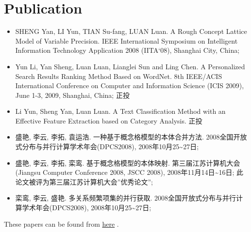 \documentclass[a4paper,10pt,english]{manual}
\begin{document}
\section{Publication}
\begin{itemize}
\item {} 
SHENG Yan, LI Yun, TIAN Su-fang, LUAN Luan. A Rough Concept Lattice Model of Variable Precision. IEEE International Symposium on Intelligent Information Technology Application 2008 (IITA`08), Shanghai City, China;

\item {} 
Yun Li, Yan Sheng, Luan Luan, Lianglei Sun and Ling Chen. A Personalized Search Results Ranking Method Based on WordNet. 8th IEEE/ACIS International Conference on Computer and Information Science (ICIS 2009), June 1-3, 2009, Shanghai, China; 正投

\item {} 
Li Yun, Sheng Yan, Luan Luan. A Text Classification Method with an Effective Feature Extraction based on Category Analysis. 正投

\item {} 
盛艳, 李云, 李拓, 袁运浩. 一种基于概念格模型的本体合并方法. 2008全国开放式分布与并行计算学术年会(DPCS2008), 2008年10月25\textasciitilde{}27日;

\item {} 
盛艳, 李云, 李拓, 栾鸾. 基于概念格模型的本体映射. 第三届江苏计算机大会(Jiangsu Computer Conference 2008, JSCC 2008), 2008年11月14日\textasciitilde{}16日; 此论文被评为第三届江苏计算机大会''优秀论文'';

\item {} 
栾鸾, 李云, 盛艳. 多关系频繁项集的并行获取. 2008全国开放式分布与并行计算学术年会(DPCS2008), 2008年10月25\textasciitilde{}27日;

\end{itemize}

These papers can be found from \href{http://github.com/lizzie/lizworkspace/tree/cb82ad8d84a1b1a12df80e3508e3629abf09ac83/paper}{here} .
\end{document}
